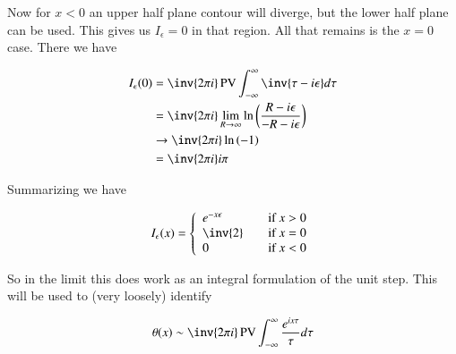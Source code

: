 Now for $x<0$ an upper half plane contour will diverge, but the lower half plane can be used.  This gives us $I_\epsilon = 0$ in that region.
All that remains is the $x=0$ case.  There we have

\begin{align*}
I_\epsilon(0)
&= \inv{2\pi i} \PV \IIinf \inv{\tau - i\epsilon} d\tau \\
&= \inv{2\pi i} \lim_{R \rightarrow \infty} \ln\left( \frac{R - i\epsilon} {-R - i\epsilon} \right) \\
& \rightarrow \inv{2\pi i} \ln\left( -1 \right) \\
&= \inv{2\pi i} i \pi \\
\end{align*}

Summarizing we have

\begin{align*}
I_\epsilon(x) =
\left\{
\begin{array}{l l}
e^{-x\epsilon} & \quad \mbox{if $x > 0$} \\
\inv{2} & \quad \mbox{if $x = 0$} \\
0 & \quad \mbox{if $x < 0$} \\
\end{array}
\right.
\end{align*}

So in the limit this does work as an integral formulation of the unit step.  This will be used to (very loosely) identify

\begin{align}\label{eqn:poisson:heavysideUnitIntegral}
\theta(x) \sim \inv{2\pi i} \PV \IIinf \frac{e^{ix\tau}}{\tau} d\tau
\end{align}
